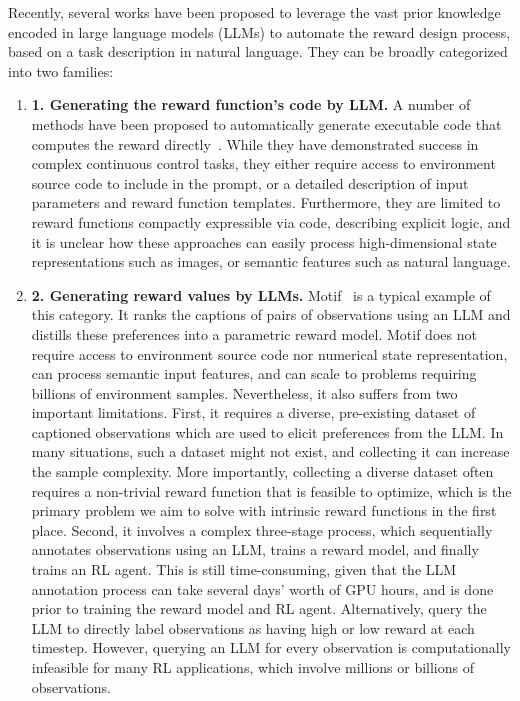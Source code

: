 Recently, several works have been proposed to leverage the vast prior knowledge encoded in large language models (LLMs) to automate the reward design process, based on a task description in natural language.
%
%
They can be broadly categorized into two families:
\begin{enumerate}[itemsep=0pt, topsep=0pt, leftmargin=0pt]
\vspace*{-3pt}
\item[] \textbf{1. Generating the reward function's code by LLM.}
  A number of methods have been proposed to automatically generate
  executable code that computes the reward directly~\citep{ma2023eureka, xie2023text2reward, yu2023language, li2024auto}. 
  While they have demonstrated success in complex continuous control tasks, they either require access to environment source code to include in the prompt, or a detailed description of input parameters and reward function templates.
  Furthermore, they are limited to reward functions compactly expressible via code,  describing explicit logic, and it is unclear how these approaches can easily process high-dimensional state representations such as images, or semantic features such as natural language. 
  
%
%
%
%
%
%

\item[] \textbf{2. Generating reward values by LLMs.} 
  Motif~\citep{klissarovdoro2023motif, klissarov2024maestromotif} is a typical example of this category.
  It ranks the captions of pairs of observations using an LLM and distills these preferences into a parametric reward model. Motif does not require access to environment source code nor numerical state representation, can process semantic input features, and can scale to problems requiring billions of environment samples.
  Nevertheless, it also suffers from two important limitations. First, it requires a diverse, pre-existing dataset of captioned observations which are used to elicit preferences from the LLM. In many situations, such a dataset might not exist, and collecting it can increase the sample complexity.
  More importantly, collecting a diverse dataset often requires a non-trivial reward function that is feasible to optimize,
  which is the primary problem we aim to solve with intrinsic reward functions in the first place. 
  Second, it involves a complex three-stage process, which sequentially annotates observations using an LLM, trains a reward model, and finally trains an RL agent. This is still time-consuming, given that the LLM annotation process can take several days' worth of GPU hours,
  and is done prior to training the reward model and RL agent.
  Alternatively, \citet{chu2023accelerating} query the LLM to directly label observations as having high or low reward at each timestep. 
  However, querying an LLM for every observation is computationally infeasible for many RL applications, which involve 
  millions or billions of observations.  
%
\end{enumerate}
